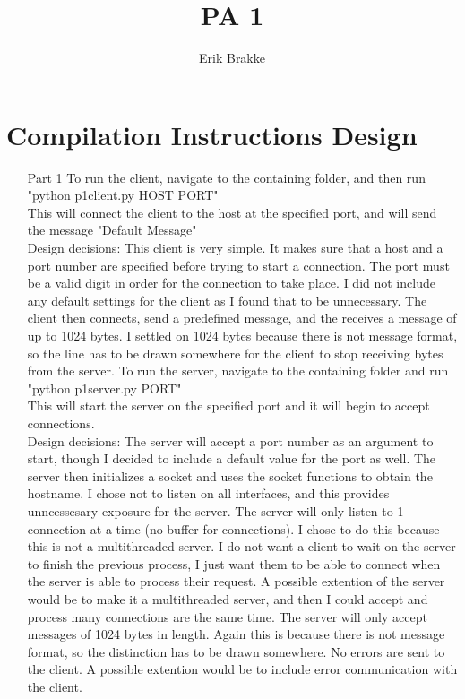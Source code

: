 \documentclass[11pt]{article}
\theoremstyle{definition}
\begin{document}
\title{PA 1}
\author{Erik Brakke}
\maketitle

\thispagestyle{fancy}
 
 
\section*{Compilation Instructions  Design}
\begin{enumerate}
\item[Part 1]
To run the client, navigate to the containing folder, and then run "python p1client.py HOST PORT"\\
This will connect the client to the host at the specified port, and will send the message "Default Message"\\
\newline
Design decisions:  This client is very simple.  It makes sure that a host and a port number are specified before trying to start a connection.  The port must be a valid digit in order for the connection to take place.  I did not include any default settings for the client as I found that to be unnecessary.  The client then connects, send a predefined message, and the receives a message of up to 1024 bytes.  I settled on 1024 bytes because there is not message format, so the line has to be drawn somewhere for the client to stop receiving bytes from the server.  
\newline
To run the server, navigate to the containing folder and run "python p1server.py PORT"\\
This will start the server on the specified port and it will begin to accept connections.  \\
\newline
Design decisions: The server will accept a port number as an argument to start, though I decided to include a default value for the port as well.  The server then initializes a socket and uses the socket functions to obtain the hostname.  I chose not to listen on all interfaces, and this provides unncessesary exposure for the server.  The server will only listen to 1 connection at a time (no buffer for connections).  I chose to do this because this is not a multithreaded server.  I do not want a client to wait on the server to finish the previous process, I just want them to be able to connect when the server is able to process their request.  A possible extention of the server would be to make it a multithreaded server, and then I could accept and process many connections are the same time.  The server will only accept messages of 1024 bytes in length.  Again this is because there is not message format, so the distinction has to be drawn somewhere.  No errors are sent to the client.  A possible extention would be to include error communication with the client.

\end{enumerate}
\end{document}
